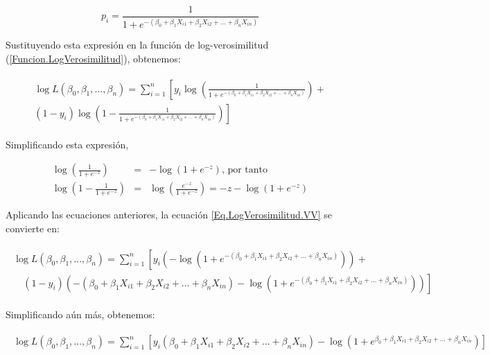 \documentclass[a4paper]{report} %
\begin{document}
\begin{equation}\label{Eq.Logit1.Multi}
p_i = \frac{1}{1 + e^{-(\beta_0 + \beta_1 X_{i1} + \beta_2 X_{i2} + \ldots + \beta_n X_{in})}}
\end{equation}

Sustituyendo esta expresión en la función de log-verosimilitud (\ref{Funcion.LogVerosimilitud}), obtenemos:

\begin{eqnarray}\label{Eq.LogVerosimilitud.VV}
\begin{array}{l}
\log L(\beta_0, \beta_1, \ldots, \beta_n) = \sum_{i=1}^{n} \left[ y_i \log \left( \frac{1}{1 + e^{-(\beta_0 + \beta_1 X_{i1} + \beta_2 X_{i2} + \ldots + \beta_n X_{in})}} \right) + \right. \\
 \left. (1 - y_i) \log \left( 1 - \frac{1}{1 + e^{-(\beta_0 + \beta_1 X_{i1} + \beta_2 X_{i2} + \ldots + \beta_n X_{in})}} \right) \right]
\end{array}
\end{eqnarray}

Simplificando esta expresión,

\begin{eqnarray}
\log \left( \frac{1}{1 + e^{-z}} \right) &=& -\log(1 + e^{-z})\textrm{, por tanto}\\
\log \left( 1 - \frac{1}{1 + e^{-z}} \right) &=& \log \left( \frac{e^{-z}}{1 + e^{-z}} \right) = -z - \log(1 + e^{-z})
\end{eqnarray}

Aplicando las ecuaciones anteriores, la ecuaci\'on \ref{Eq.LogVerosimilitud.VV} se convierte en:

\begin{eqnarray*}
\begin{array}{l}
\log L(\beta_0, \beta_1, \ldots, \beta_n) = \sum_{i=1}^{n} \left[ y_i (-\log(1 + e^{-(\beta_0 + \beta_1 X_{i1} + \beta_2 X_{i2} + \ldots + \beta_n X_{in})})) + \right. \nonumber \\
 \quad \left. (1 - y_i) \left( -(\beta_0 + \beta_1 X_{i1} + \beta_2 X_{i2} + \ldots + \beta_n X_{in}) - \log(1 + e^{-(\beta_0 + \beta_1 X_{i1} + \beta_2 X_{i2} + \ldots + \beta_n X_{in})}) \right) \right]
\end{array}
\end{eqnarray*}

Simplificando aún más, obtenemos:

\begin{eqnarray}
\begin{array}{r}
\log L(\beta_0, \beta_1, \ldots, \beta_n) =\sum_{i=1}^{n} \left[ y_i (\beta_0 + \beta_1 X_{i1} + \beta_2 X_{i2} + \ldots + \beta_n X_{in}) -\log(1 + e^{\beta_0 + \beta_1 X_{i1} + \beta_2 X_{i2} + \ldots + \beta_n X_{in}}) \right]
\end{array}
\end{eqnarray}
\end{document}
